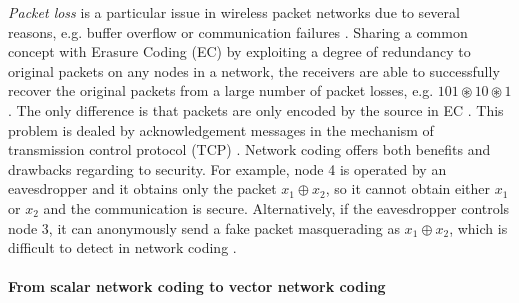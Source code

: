 \textit{Packet loss} is a particular issue in wireless packet networks
due to several reasons, e.g. buffer overflow or communication failures
\cite{Ho:2008}. Sharing a common concept with Erasure Coding (EC)
by exploiting a degree of redundancy to original packets on any nodes
in a network, the receivers are able to successfully recover the original
packets from a large number of packet losses, e.g. $101\circledast10\circledast1$.
The only difference is that packets are only encoded by the source
in EC \cite{Fujimura:2008}. This problem is dealed by acknowledgement
messages in the mechanism of transmission control protocol (TCP) \cite{Ho:2008}.
Network coding offers both benefits and drawbacks regarding to security.
For example, node 4 is operated by an eavesdropper and it obtains
only the packet $x_{1}\oplus x_{2}$, so it cannot obtain either $x_{1}$
or $x_{2}$ and the communication is secure. Alternatively, if the
eavesdropper controls node 3, it can anonymously send a fake packet
masquerading as $x_{1}\oplus x_{2}$, which is difficult to detect
in network coding \cite{Ho:2008}.

\paragraph{From scalar network coding to vector network coding}

